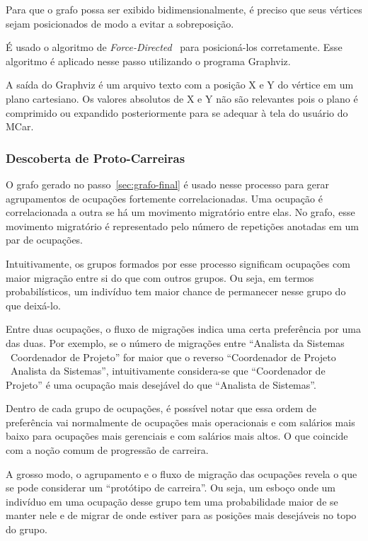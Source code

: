 \documentclass[12pt,a4paper]{article}
\begin{document}
Para que o grafo possa ser exibido bidimensionalmente, é preciso que seus vértices sejam posicionados de modo a evitar a sobreposição.

É usado o algoritmo de \textit{Force-Directed}~ para posicioná-los corretamente. Esse algoritmo é aplicado nesse passo utilizando o programa Graphviz.

A saída do Graphviz é um arquivo texto com a posição X e Y do vértice em um plano cartesiano. Os valores absolutos de X e Y não são relevantes pois o plano é comprimido ou expandido posteriormente para se adequar à tela do usuário do MCar.

\subsubsection{Descoberta de Proto-Carreiras}

O grafo gerado no passo~\ref{sec:grafo-final} é usado nesse processo para gerar agrupamentos de ocupações fortemente correlacionadas. Uma ocupação é correlacionada a outra se há um movimento migratório entre elas. No grafo, esse movimento migratório é representado pelo número de repetições anotadas em um par de ocupações.

Intuitivamente, os grupos formados por esse processo significam ocupações com maior migração entre si do que com outros grupos. Ou seja, em termos probabilísticos, um indivíduo tem maior chance de permanecer nesse grupo do que deixá-lo.

Entre duas ocupações, o fluxo de migrações indica uma certa preferência por uma das duas. Por exemplo, se o número de migrações entre \enquote{Analista da Sistemas \textrightarrow~Coordenador de Projeto} for maior que o reverso \enquote{Coordenador de Projeto \textrightarrow~Analista da Sistemas}, intuitivamente considera-se que \enquote{Coordenador de Projeto} é uma ocupação mais desejável do que \enquote{Analista de Sistemas}.

Dentro de cada grupo de ocupações, é possível notar que essa ordem de preferência vai normalmente de ocupações mais operacionais e com salários mais baixo para ocupações mais gerenciais e com salários mais altos. O que coincide com a noção comum de progressão de carreira.

A grosso modo, o agrupamento e o fluxo de migração das ocupações revela o que se pode considerar um \enquote{protótipo de carreira}. Ou seja, um esboço onde um indivíduo em uma ocupação desse grupo tem uma probabilidade maior de se manter nele e de migrar de onde estiver para as posições mais desejáveis no topo do grupo.
\end{document}
